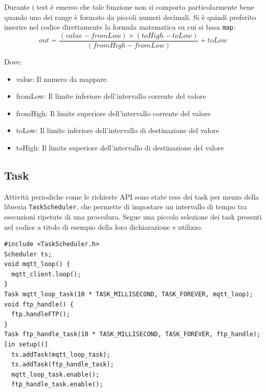 \documentclass[12pt,a4paper]{report}
\begin{document}
Durante i test è emerso che tale funzione non si comporta particolarmente bene quando uno dei range è formato da piccoli numeri
decimali. Si è quindi preferito inserire nel codice direttamente la formula matematica su cui si basa \texttt{map}:
\[out = \frac{(value - fromLow) \times (toHigh - toLow)}{(fromHigh - fromLow)} + toLow \]

\noindent Dove:\cite{arduinomap}
\begin{itemize}
  \item value: Il numero da mappare.
  \item fromLow: Il limite inferiore dell'intervallo corrente del valore
  \item fromHigh: Il limite superiore dell'intervallo corrente del valore
  \item toLow: Il limite inferiore dell'intervallo di destinazione del valore
  \item toHigh: Il limite superiore dell'intervallo di destinazione del valore
\end{itemize}

\subsection{Task}
Attività periodiche come le richieste API sono state rese dei task per mezzo della libreria \texttt{TaskScheduler}, che permette di
impostare un intervallo di tempo tra esecuzioni ripetute di una procedura.
Segue una piccola selezione dei task presenti nel codice a titolo di esempio della loro dichiarazione e utilizzo.
\begin{lstlisting}
#include <TaskScheduler.h>
Scheduler ts;
void mqtt_loop() {
  mqtt_client.loop();
}
Task mqtt_loop_task(10 * TASK_MILLISECOND, TASK_FOREVER, mqtt_loop);
void ftp_handle() {
  ftp.handleFTP();
}
Task ftp_handle_task(10 * TASK_MILLISECOND, TASK_FOREVER, ftp_handle);
[in setup()]
  ts.addTask(mqtt_loop_task);
  ts.addTask(ftp_handle_task);
  mqtt_loop_task.enable();
  ftp_handle_task.enable();

\end{lstlisting}
\end{document}

